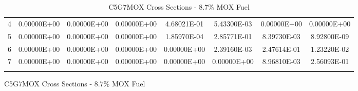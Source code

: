 \begin{figure}
\begin{table}[H]
\begin{subtable}[h]{1.0\textwidth}
{\begin{tabular}{*8c}
4 &	0.00000E+00 &	0.00000E+00 &	0.00000E+00	& 4.68021E-01	& 5.43300E-03	& 0.00000E+00	& 0.00000E+00 \\
5 &	0.00000E+00 &	0.00000E+00 &	0.00000E+00	& 1.85970E-04	& 2.85771E-01	& 8.39730E-03	& 8.92800E-09 \\
6 &	0.00000E+00 &	0.00000E+00 &	0.00000E+00	& 0.00000E+00	& 2.39160E-03	& 2.47614E-01	& 1.23220E-02 \\
7 &	0.00000E+00 &	0.00000E+00 &	0.00000E+00	& 0.00000E+00	& 0.00000E+00	& 8.96810E-03	& 2.56093E-01 \\
        \bottomrule
        & & & & & & & 
    \end{tabular}}
  \end{subtable}
  \caption{C5G7MOX Cross Sections - 8.7\% MOX Fuel}
\end{table}
\end{figure}


